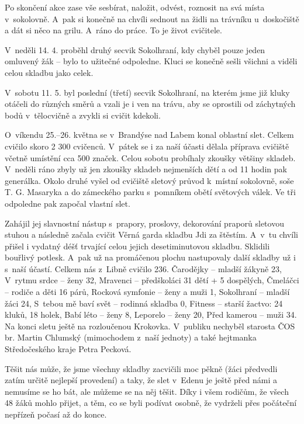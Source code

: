 \documentclass[11pt]{article}
\begin{document}
Po skončení akce zase vše sesbírat, naložit, odvést, roznosit na svá místa v~sokolovně. A~pak si konečně na chvíli sednout na židli na trávníku u~doskočiště a dát si něco na grilu. A~ráno do práce. To je život cvičitele.

V~neděli 14. 4. proběhl druhý secvik Sokolhraní, kdy chyběl pouze jeden omluvený žák – bylo to užitečné odpoledne. Kluci se konečně sešli všichni a viděli celou skladbu jako celek.

V~sobotu 11. 5. byl poslední (třetí) secvik Sokolhraní, na kterém jsme již kluky otáčeli do různých směrů a vzali je i ven na trávu, aby se oprostili od záchytných bodů v~tělocvičně a zvykli si cvičit kdekoli. 

O~víkendu 25.–26. května se v~Brandýse nad Labem konal oblastní slet. Celkem cvičilo skoro 2 300 cvičenců. V~pátek se i za naší účasti dělala příprava cvičiště včetně umístění cca 500 značek. Celou sobotu probíhaly zkoušky většiny skladeb. V~neděli ráno zbyly už jen zkoušky skladeb nejmenších dětí a od 11 hodin pak generálka. Okolo druhé vyšel od cvičiště sletový průvod k~místní sokolovně, soše T. G. Masaryka a do zámeckého parku s~pomníkem obětí světových válek. Ve tři odpoledne pak započal vlastní slet.

Zahájil jej slavnostní nástup s~prapory, proslovy, dekorování praporů sletovou stuhou a následně začala cvičit Věrná garda skladbu Jdi za štěstím. A~v~tu chvíli přišel i vydatný déšť trvající celou jejich desetiminutovou skladbu. Sklidili bouřlivý potlesk. A~pak už na promáčenou plochu nastupovaly další skladby už i s~naší účastí. Celkem nás z~Libně cvičilo 236. Čarodějky – mladší žákyně 23, V~rytmu srdce – ženy 32, Mravenci – předškoláci 31 dětí + 5 dospělých, Čmeláčci – rodiče a děti 16 párů, Rocková symfonie – ženy a muži 1, Sokolhraní – mladší žáci 24, S~tebou mě baví svět – rodinná skladba 0, Fitness – starší žactvo: 24 kluků, 18 holek, Babí léto – ženy 8, Leporelo – ženy 20, Před kamerou – muži 34. Na konci sletu ještě na rozloučenou Krokovka. V~publiku nechyběl starosta ČOS br. Martin Chlumský (mimochodem z~naší jednoty) a také hejtmanka Středočeského kraje Petra Pecková.

Těšit nás může, že jsme všechny skladby zacvičili moc pěkně (žáci předvedli zatím určitě nejlepší provedení) a taky, že slet v~Edenu je ještě před námi a nemusíme se ho bát, ale můžeme se na něj těšit. Díky i všem rodičům, že všech 48 žáků mohlo přijet, a těm, co se byli podívat osobně, že vydrželi přes počáteční nepřízeň počasí až do konce.   
\end{document}
